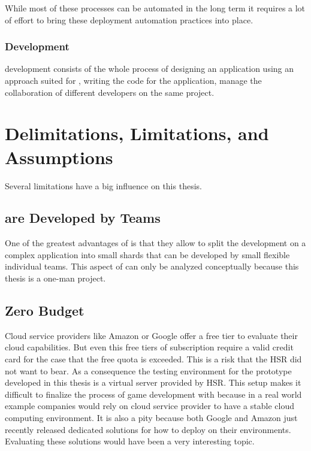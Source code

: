 While most of these processes can be automated in the long term it requires a
lot of effort to bring these deployment automation practices into place.

\subsubsection{\ms{} Development}

\ms{} development consists of the whole process of designing an application
using an approach suited for \ms{}, writing the code for the application, manage
the collaboration of different developers on the same project.

\section{Delimitations, Limitations, and Assumptions}

Several limitations have a big influence on this thesis. 

\subsection{\ms{} are Developed by Teams}
One of the greatest advantages of \mss{} is that they allow to split the
development on a complex application into small shards that can be developed by
small flexible individual teams. This aspect of \mss{} can only be analyzed
conceptually because this thesis is a one-man project.

\subsection{Zero Budget}
\label{sub:zero_buget}
Cloud service providers like Amazon or Google offer a free tier to evaluate
their cloud capabilities. But even this free tiers of subscription require a
valid credit card for the case that the free quota is exceeded. This is a risk
that the HSR did not want to bear. As a consequence the testing environment for
the prototype developed in this thesis is a virtual server provided by HSR. This
setup makes it difficult to finalize the process of game development with \mss{}
because in a real world example companies would rely on cloud service provider
to have a stable cloud computing environment. It is also a pity because both
Google and Amazon just recently released dedicated solutions for how to deploy
\ogs{} on their environments. Evaluating these solutions would have been a very
interesting topic.

